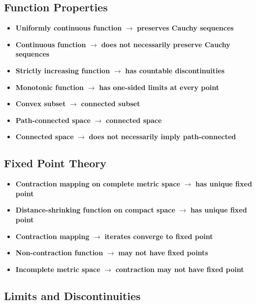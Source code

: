 \subsection*{Function Properties}

\begin{itemize}
\item \textbf{Uniformly continuous function} $\rightarrow$ \textbf{preserves Cauchy sequences}
\item \textbf{Continuous function} $\rightarrow$ \textbf{does not necessarily preserve Cauchy sequences}
\item \textbf{Strictly increasing function} $\rightarrow$ \textbf{has countable discontinuities}
\item \textbf{Monotonic function} $\rightarrow$ \textbf{has one-sided limits at every point}
\item \textbf{Convex subset} $\rightarrow$ \textbf{connected subset}
\item \textbf{Path-connected space} $\rightarrow$ \textbf{connected space}
\item \textbf{Connected space} $\rightarrow$ \textbf{does not necessarily imply path-connected}
\end{itemize}

\subsection*{Fixed Point Theory}

\begin{itemize}
\item \textbf{Contraction mapping on complete metric space} $\rightarrow$ \textbf{has unique fixed point}
\item \textbf{Distance-shrinking function on compact space} $\rightarrow$ \textbf{has unique fixed point}
\item \textbf{Contraction mapping} $\rightarrow$ \textbf{iterates converge to fixed point}
\item \textbf{Non-contraction function} $\rightarrow$ \textbf{may not have fixed points}
\item \textbf{Incomplete metric space} $\rightarrow$ \textbf{contraction may not have fixed point}
\end{itemize}

\subsection*{Limits and Discontinuities}

